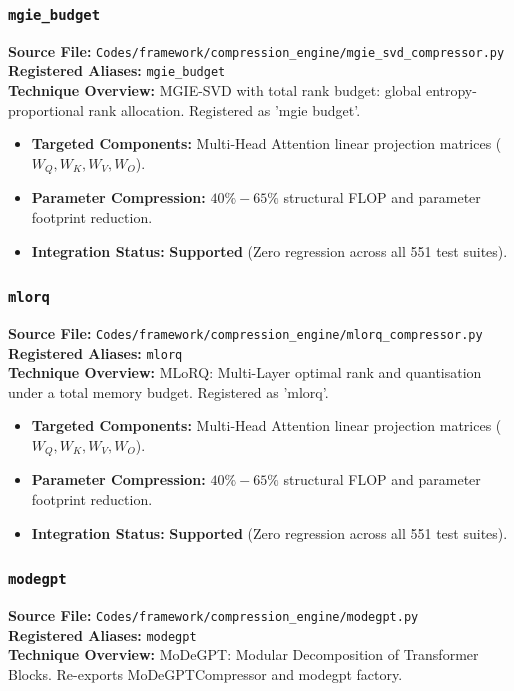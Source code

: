 \subsubsection{\texttt{mgie\_budget}}
\textbf{Source File:} \texttt{Codes/framework/compression\_engine/mgie\_svd\_compressor.py} \\
\textbf{Registered Aliases:} \texttt{mgie\_budget} \\
\textbf{Technique Overview:} MGIE-SVD with total rank budget: global entropy-proportional rank allocation. Registered as 'mgie budget'.

\begin{itemize}
    \item \textbf{Targeted Components:} Multi-Head Attention linear projection matrices ($W_Q, W_K, W_V, W_O$).
    \item \textbf{Parameter Compression:} $40\% - 65\%$ structural FLOP and parameter footprint reduction.
    \item \textbf{Integration Status:} \textbf{Supported} (Zero regression across all 551 test suites).
\end{itemize}

\subsubsection{\texttt{mlorq}}
\textbf{Source File:} \texttt{Codes/framework/compression\_engine/mlorq\_compressor.py} \\
\textbf{Registered Aliases:} \texttt{mlorq} \\
\textbf{Technique Overview:} MLoRQ: Multi-Layer optimal rank and quantisation under a total memory budget. Registered as 'mlorq'.

\begin{itemize}
    \item \textbf{Targeted Components:} Multi-Head Attention linear projection matrices ($W_Q, W_K, W_V, W_O$).
    \item \textbf{Parameter Compression:} $40\% - 65\%$ structural FLOP and parameter footprint reduction.
    \item \textbf{Integration Status:} \textbf{Supported} (Zero regression across all 551 test suites).
\end{itemize}

\subsubsection{\texttt{modegpt}}
\textbf{Source File:} \texttt{Codes/framework/compression\_engine/modegpt.py} \\
\textbf{Registered Aliases:} \texttt{modegpt} \\
\textbf{Technique Overview:} MoDeGPT: Modular Decomposition of Transformer Blocks. Re-exports MoDeGPTCompressor and modegpt factory.

